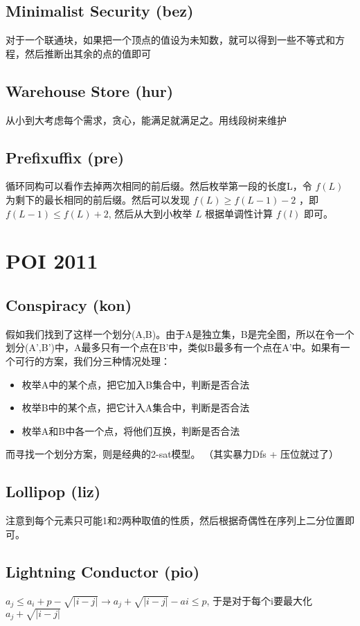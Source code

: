 \documentclass[a4paper,11pt]{article}
\begin{document}
\subsection*{Minimalist Security (bez)}
对于一个联通块，如果把一个顶点的值设为未知数，就可以得到一些不等式和方程，然后推断出其余的点的值即可
\subsection*{Warehouse Store (hur)}
从小到大考虑每个需求，贪心，能满足就满足之。用线段树来维护
\subsection*{Prefixuffix (pre)}
循环同构可以看作去掉两次相同的前后缀。然后枚举第一段的长度L，令 $f(L)$ 为剩下的最长相同的前后缀。然后可以发现 $f(L) \ge f(L-1)-2$ ，即 $f(L - 1) \le f(L) + 2$, 然后从大到小枚举 $L$ 根据单调性计算 $f(l)$ 即可。

\section{POI 2011}
\subsection*{Conspiracy (kon)}
假如我们找到了这样一个划分(A,B)。由于A是独立集，B是完全图，所以在令一个划分(A',B')中，A最多只有一个点在B'中，类似B最多有一个点在A'中。如果有一个可行的方案，我们分三种情况处理：
\begin{itemize}
	\item 枚举A中的某个点，把它加入B集合中，判断是否合法
	\item 枚举B中的某个点，把它计入A集合中，判断是否合法
	\item 枚举A和B中各一个点，将他们互换，判断是否合法
\end{itemize}
而寻找一个划分方案，则是经典的2-sat模型。 （其实暴力Dfs + 压位就过了）
\subsection*{Lollipop (liz)}
注意到每个元素只可能1和2两种取值的性质，然后根据奇偶性在序列上二分位置即可。
\subsection*{Lightning Conductor (pio)}
$a_j\le a_i + p - \sqrt{|i - j|} \rightarrow a_j + \sqrt{|i - j|} - ai \le p$, 于是对于每个i要最大化 $a_j + \sqrt{|i-j|}$ 
\end{document}
